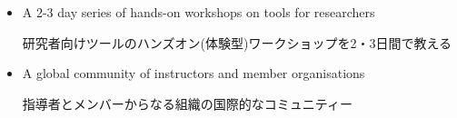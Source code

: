 \documentclass{beamer}
\begin{document}
\begin{frame}
\begin{itemize}
   \item A 2-3 day series of hands-on workshops on tools for researchers \\ \begin{CJK}{UTF8}{min}研究者向けツールのハンズオン(体験型)ワークショップを2・3日間で教える\end{CJK}
      \smallskip
   
   \item A global community of instructors and member organisations \\ \begin{CJK}{UTF8}{min}指導者とメンバーからなる組織の国際的なコミュニティー\end{CJK}
   
  
  \end{itemize}
  
  \end{frame}
  \iffalse
\begin{frame}

\begin{center}
  \end{center}

\end{frame}
\end{document}
